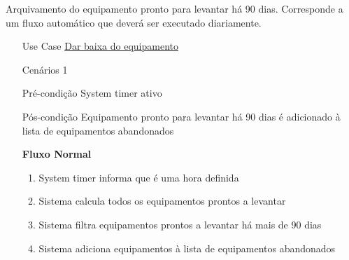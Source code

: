 \documentclass[../relatorio.tex]{subfiles}
\begin{document}
Arquivamento do equipamento pronto para levantar há 90 dias.
Corresponde a um fluxo automático que deverá ser executado diariamente.
\begin{itemize}
    \item[Use Case] {\underline{Dar baixa do equipamento}}
    \item[Cenários] {1}
    \item[Pré-condição] {System timer ativo}
    \item[Pós-condição] {Equipamento pronto para levantar há 90 dias é adicionado à lista de equipamentos abandonados}
          \begin{flushleft}
              \textbf{Fluxo Normal}
          \end{flushleft}
          \begin{enumerate}
              \item System timer informa que é uma hora definida
              \item Sistema calcula todos os equipamentos prontos a levantar
              \item Sistema filtra equipamentos prontos a levantar há mais de 90 dias
              \item Sistema adiciona equipamentos à lista de equipamentos abandonados
          \end{enumerate}
\end{itemize}
\end{document}
